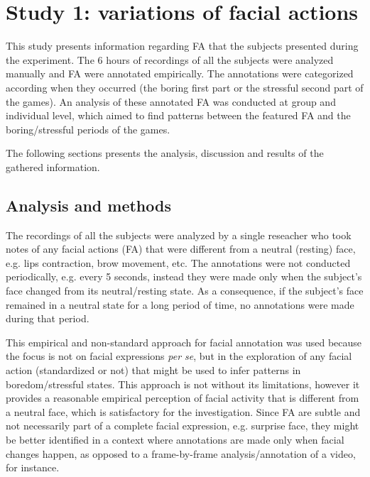 \section{Study 1: variations of facial actions}
\label{sec:experiment1-study1}

This study presents information regarding FA that the subjects presented during the experiment. The 6 hours of recordings of all the subjects were analyzed manually and FA were annotated empirically. The annotations were categorized according when they occurred (the boring first part or the stressful second part of the games). An analysis of these annotated FA was conducted at group and individual level, which aimed to find patterns between the featured FA and the boring/stressful periods of the games.

The following sections presents the analysis, discussion and results of the gathered information.

\subsection{Analysis and methods}
\label{sec:experiment1-study1-methodology}

The recordings of all the subjects were analyzed by a single reseacher who took notes of any facial actions (FA) that were different from a neutral (resting) face, e.g. lips contraction, brow movement, etc. The annotations were not conducted periodically, e.g. every 5 seconds, instead they were made only when the subject's face changed from its neutral/resting state. As a consequence, if the subject's face remained in a neutral state for a long period of time, no annotations were made during that period.

This empirical and non-standard approach for facial annotation was used because the focus is not on facial expressions \textit{per se}, but in the exploration of any facial action (standardized or not) that might be used to infer patterns in boredom/stressful states. This approach is not without its limitations, however it provides a reasonable empirical perception of facial activity that is different from a neutral face, which is satisfactory for the investigation. Since FA are subtle and not necessarily part of a complete facial expression, e.g. surprise face, they might be better identified in a context where annotations are made only when facial changes happen, as opposed to a frame-by-frame analysis/annotation of a video, for instance.

